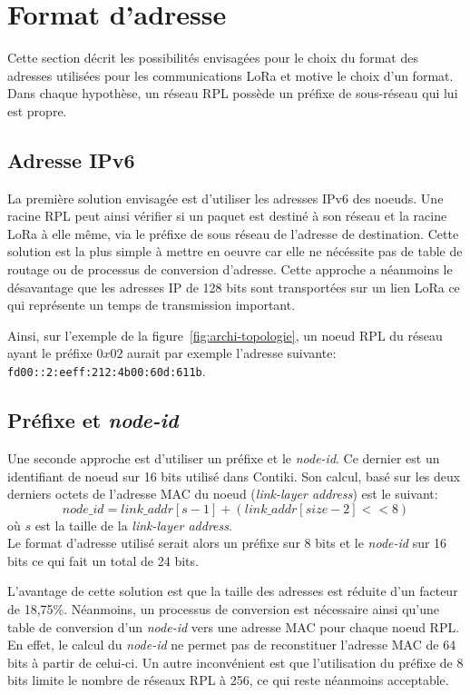 \section{Format d'adresse}\label{sec:archi-adresses}
\renewcommand{\rightmark}{Format d'adresse}

Cette section décrit les possibilités envisagées pour le choix du format des adresses utilisées pour les communications LoRa et motive le choix d'un format. Dans chaque hypothèse, un réseau RPL possède un préfixe de sous-réseau qui lui est propre.

\subsection*{Adresse IPv6}
    La première solution envisagée est d'utiliser les adresses IPv6 des noeuds.
    Une racine RPL peut ainsi vérifier si un paquet est destiné à son réseau et la racine LoRa à elle même,
    via le préfixe de sous réseau de l'adresse de destination.
    Cette solution est la plus simple à mettre en oeuvre car elle ne nécéssite pas de table de routage ou de processus de conversion d'adresse. Cette approche a néanmoins le désavantage que les adresses IP de 128 bits sont transportées sur un lien LoRa ce qui représente un temps de transmission important.

    Ainsi, sur l'exemple de la figure~\ref{fig:archi-topologie}, un noeud RPL du réseau ayant le préfixe $0x02$ aurait par exemple l'adresse suivante:\newline 
    \texttt{fd00::2:eeff:212:4b00:60d:611b}.
    
\subsection*{Préfixe et \textit{node-id}}
    Une seconde approche est d'utiliser un préfixe et le \textit{node-id}. Ce dernier est un identifiant de noeud sur 16 bits utilisé dans Contiki. Son calcul, basé sur les deux derniers octets de l'adresse MAC du noeud (\textit{link-layer address}) est le suivant:
    \[
        node\_id = link\_addr[s-1] + (link\_addr[size -2] << 8)
    \]
    où $s$ est la taille de la \textit{link-layer address}.\\

    Le format d'adresse utilisé serait alors un préfixe sur 8 bits et le \textit{node-id} sur 16 bits ce qui fait un total de 24 bits.

    L'avantage de cette solution est que la taille des adresses est réduite d'un facteur de 18,75\%. Néanmoins, un processus de conversion est nécessaire ainsi qu'une table de conversion d'un \textit{node-id} vers une adresse MAC pour chaque noeud RPL. En effet, le calcul du \textit{node-id} ne permet pas de reconstituer l'adresse MAC de 64 bits à partir de celui-ci.
    Un autre inconvénient est que l'utilisation du préfixe de 8 bits limite le nombre de réseaux RPL à 256, ce qui reste néanmoins acceptable.


